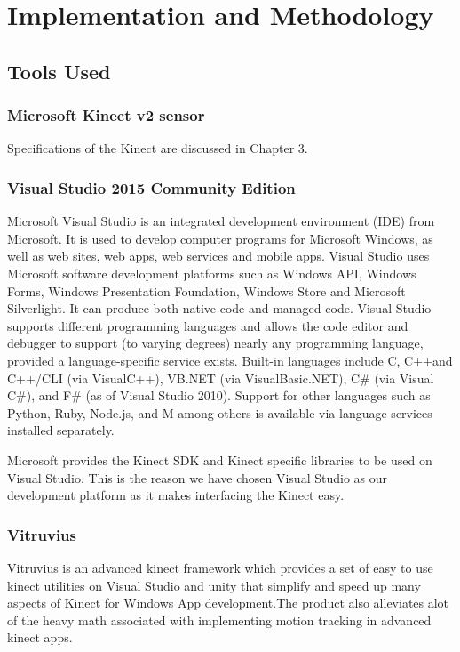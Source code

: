 
\chapter{Implementation and Methodology} \label{Implementation and Methodology}

\section{Tools Used } \label{Tools Used }
\subsection{Microsoft Kinect v2 sensor} \label{Microsoft Kinect v2 sensor} 
\noindent Specifications of the Kinect are discussed in Chapter 3.
\subsection{Visual Studio 2015 Community Edition }\label{Visual Studio 2015 Community Edition }  
\noindent Microsoft Visual Studio is an integrated development environment (IDE) from Microsoft. It is used to develop computer programs for Microsoft Windows, as well as web sites, web apps, web services and mobile apps. Visual Studio uses Microsoft software development platforms such as Windows API, Windows Forms, Windows Presentation Foundation, Windows Store and Microsoft Silverlight. It can produce both native code and managed code. Visual Studio supports different programming languages and allows the code editor and debugger to support (to varying degrees) nearly any programming language, provided a language-specific service exists. Built-in languages include C, C++and C++/CLI (via VisualC++), VB.NET (via VisualBasic.NET), C\# (via Visual C\#), and F\# (as of Visual Studio 2010). Support for other languages such as Python, Ruby, Node.js, and M among others is available via language services installed separately.

\noindent Microsoft provides the Kinect SDK and Kinect specific libraries to be used on Visual Studio. This is the reason we have chosen Visual Studio as our development platform as it makes interfacing the Kinect easy. 

\subsection{Vitruvius }\label{Vitruvius}
\noindent Vitruvius is an advanced kinect framework which provides a set of easy to use kinect utilities on Visual Studio and unity that simplify and speed up many aspects of Kinect for Windows App development.The product also alleviates alot of the heavy math associated with implementing motion tracking in advanced kinect apps.

